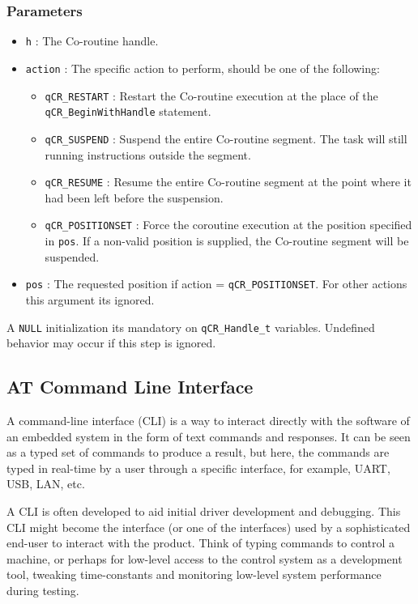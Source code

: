 \subsubsection*{Parameters}
\begin{itemize}
    \item \lstinline{h} : The Co-routine handle.
    \item \lstinline{action} : The specific action to perform, should be one of the following:
    \begin{itemize}
        \item \lstinline{qCR_RESTART} : Restart the Co-routine execution at the place of the \lstinline{qCR_BeginWithHandle} statement.  
        \item \lstinline{qCR_SUSPEND} :  Suspend the entire Co-routine segment. The task will still running instructions outside the segment.
        \item \lstinline{qCR_RESUME} : Resume the entire Co-routine segment at the point where it had been left before the suspension.
        \item \lstinline{qCR_POSITIONSET} : Force the coroutine execution at the position specified in \lstinline{pos}. If a non-valid position is supplied, the Co-routine segment will be suspended.      
    \end{itemize}
    \item \lstinline{pos} : The requested position if action = \lstinline{qCR_POSITIONSET}. For other actions this argument its ignored.  
\end{itemize}

\hrulefill
\medskip

\begin{tcolorbox}
\HandRight A \lstinline{NULL} initialization its mandatory on \lstinline{qCR_Handle_t} variables. Undefined behavior may occur if this step is ignored.
\end{tcolorbox}

\subsection{AT Command Line Interface} 
A command-line interface (CLI) is a way to interact directly with the software of an embedded system in the form of text commands and responses. It can be seen as a typed set of commands to produce a result, but here, the commands are typed in real-time by a user through a specific interface, for example, UART, USB, LAN, etc. 

A CLI is often developed to aid initial driver development and debugging. This CLI might become the interface (or one of the interfaces) used by a sophisticated end-user to interact with the product. Think of typing commands to control a machine, or perhaps for low-level access to the control system as a development tool, tweaking time-constants and monitoring low-level system performance during testing. 


